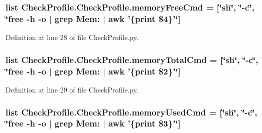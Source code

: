 \hypertarget{classCheckProfile_1_1CheckProfile_a8a9c2299135872cfccf2b0cb25ba854b}{
\subsubsection[{memory\-Free\-Cmd}]{\setlength{\rightskip}{0pt plus 5cm}list Check\-Profile.\-Check\-Profile.\-memory\-Free\-Cmd = \mbox{[}\char`\"{}sh\char`\"{}, \char`\"{}-\/c\char`\"{}, \char`\"{}free -\/h -\/o $\vert$ grep Mem\-: $\vert$ awk '\{print \$4\}'\char`\"{}\mbox{]}\hspace{0.3cm}{\ttfamily [static]}}}\label{classCheckProfile_1_1CheckProfile_a8a9c2299135872cfccf2b0cb25ba854b}


Definition at line 28 of file Check\-Profile.\-py.

\hypertarget{classCheckProfile_1_1CheckProfile_a097bc2442305e7d6eebaff44a53c16f3}{
\subsubsection[{memory\-Total\-Cmd}]{\setlength{\rightskip}{0pt plus 5cm}list Check\-Profile.\-Check\-Profile.\-memory\-Total\-Cmd = \mbox{[}\char`\"{}sh\char`\"{}, \char`\"{}-\/c\char`\"{}, \char`\"{}free -\/h -\/o $\vert$ grep Mem\-: $\vert$ awk '\{print \$2\}'\char`\"{}\mbox{]}\hspace{0.3cm}{\ttfamily [static]}}}\label{classCheckProfile_1_1CheckProfile_a097bc2442305e7d6eebaff44a53c16f3}


Definition at line 29 of file Check\-Profile.\-py.

\hypertarget{classCheckProfile_1_1CheckProfile_a3c36cf35599b47c7158008533cc9cb39}{
\subsubsection[{memory\-Used\-Cmd}]{\setlength{\rightskip}{0pt plus 5cm}list Check\-Profile.\-Check\-Profile.\-memory\-Used\-Cmd = \mbox{[}\char`\"{}sh\char`\"{}, \char`\"{}-\/c\char`\"{}, \char`\"{}free -\/h -\/o $\vert$ grep Mem\-: $\vert$ awk '\{print \$3\}'\char`\"{}\mbox{]}\hspace{0.3cm}{\ttfamily [static]}}}\label{classCheckProfile_1_1CheckProfile_a3c36cf35599b47c7158008533cc9cb39}


